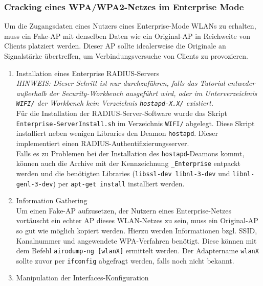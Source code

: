 \subsubsection{Cracking eines WPA/WPA2-Netzes im Enterprise Mode}
Um die Zugangsdaten eines Nutzers eines Enterprise-Mode WLANs zu erhalten, muss ein Fake-AP mit denselben Daten wie ein Original-AP in Reichweite von Clients platziert werden. Dieser AP sollte idealerweise die Originale an Signalstärke übertreffen, um Verbindungsversuche von Clients zu provozieren.
\begin{enumerate}
	\item {Installation eines Enterprise RADIUS-Servers} \\
	\textit{HINWEIS: Dieser Schritt ist nur durchzuführen, falls das Tutorial entweder außerhalb der Security-Workbench ausgeführt wird, oder im Unterverzeichnis \colorbox{altgray}{\lstinline|WIFI/|} der Workbench kein Verzeichnis \colorbox{altgray}{\lstinline|hostapd-X.X/|} existiert.} \\
	Für die Installation der RADIUS-Server-Software wurde das Skript \\ \colorbox{altgray}{\lstinline|Enterprise-ServerInstall.sh|} im Verzeichnis \colorbox{altgray}{\lstinline|WIFI/|} abgelegt. Diese Skript installiert neben wenigen Libraries den Deamon \colorbox{altgray}{\lstinline|hostapd|}. Dieser implementiert einen RADIUS-Authentifizierungsserver.\\
	Falls es zu Problemen bei der Installation des \colorbox{altgray}{\lstinline|hostapd|}-Deamons kommt, können auch die Archive mit der Kennzeichnung \colorbox{altgray}{\lstinline|_Enterprise|} entpackt werden und die benötigten Libraries (\colorbox{altgray}{\lstinline|libssl-dev libnl-3-dev|} und \colorbox{altgray}{\lstinline|libnl-genl-3-dev|}) per \colorbox{altgray}{\lstinline|apt-get install|} installiert werden.
	\item {Information Gathering}\\
	Um einen Fake-AP aufzusetzen, der Nutzern eines Enterprise-Netzes vortäuscht ein echter AP dieses WLAN-Netzes zu sein, muss ein Original-AP so gut wie möglich kopiert werden. Hierzu werden Informationen bzgl. SSID, Kanalnummer und angewendete WPA-Verfahren benötigt. Diese können mit dem Befehl  \colorbox{altgray}{\lstinline|airodump-ng [wlanX]|} ermittelt werden. Der Adaptername \colorbox{altgray}{\lstinline|wlanX|} sollte zuvor per \colorbox{altgray}{\lstinline|ifconfig|} abgefragt werden, falls noch nicht bekannt.
	\item {Manipulation der Interfaces-Konfiguration}\\

\end{enumerate}
